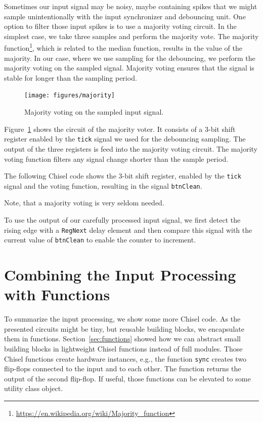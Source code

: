 \documentclass[%
    10pt,
    headinclude, footexclude,
    openright, %
    notitlepage,
    cleardoubleempty,
    headsepline,
    pointlessnumbers,
    bibtotoc, idxtotoc,
    ]{scrbook}
\newcommand{\code}[1]{{\small{\texttt{#1}}}}
\newcommand{\myref}[2]{\href{#1}{#2}}
\renewcommand{\myref}[2]{{#2}{\footnote{\url{#1}}}}
\begin{document}

Sometimes our input signal may be noisy, maybe containing spikes
that we might sample unintentionally with the input synchronizer and
debouncing unit.
One option to filter those input spikes is to use a majority voting
circuit. In the simplest case, we take three samples and perform
the majority vote. The \myref{https://en.wikipedia.org/wiki/Majority_function}{majority function},
which is related to the median function, results in the value of the majority.
In our case, where we use sampling for the debouncing, we perform the
majority voting on the sampled signal.
Majority voting ensures that the signal is stable for longer than the sampling period.

\begin{figure}
  \centering
  \texttt{[image: figures/majority]}
  \caption{Majority voting on the sampled input signal.}
  \label{fig:majority}
\end{figure}

Figure~\ref{fig:majority} shows the circuit of the majority voter.
It consists of a 3-bit shift register enabled by the \code{tick} signal
we used for the debouncing sampling. The output of the three registers
is feed into the majority voting circuit. The majority voting function filters
any signal change shorter than the sample period. 

The following Chisel code shows the 3-bit shift register, enabled by the
\code{tick} signal and the voting function, resulting in the signal \code{btnClean}.

Note, that a majority voting is very seldom needed.


To use the output of our carefully processed input signal, we first detect
the rising edge with a \code{RegNext} delay element and then compare this
signal with the current value of \code{btnClean} to enable the counter to increment.



\section{Combining the Input Processing with Functions}

To summarize the input processing, we show some more Chisel code.
As the presented circuits might be tiny, but reusable building blocks, we encapsulate
them in functions. Section~\ref{sec:functions} showed how we can abstract
small building blocks in lightweight Chisel functions instead of full modules.
Those Chisel functions create hardware instances, e.g., the function
\code{sync} creates two flip-flops connected to the input and to each other.
The function returns the output of the second flip-flop.
If useful, those functions can be elevated to some utility class object.
\end{document}
